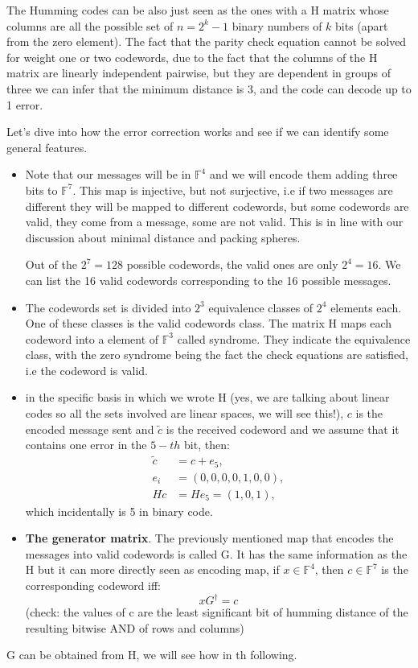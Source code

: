 The Humming codes can be also just seen as the ones with a H matrix whose columns are all the possible set of $n = 2^k-1$ binary numbers of $k$ bits (apart from the zero element). The fact that the parity check equation cannot be solved for weight one or two codewords, due to the fact that the columns of the H matrix are linearly independent pairwise, but they are dependent in groups of three we can infer that the minimum distance is 3, and the code can decode up to 1 error.


Let's dive into how the error correction works and see if we can identify some general features.

\begin{itemize}
	\item Note that our messages will be in $\mathbb{F}^4$ and we will encode them adding three bits to $\mathbb{F}^7$. This map is injective, but not surjective, i.e if two messages are different they will be mapped to different codewords, but some codewords are valid, they come from a message, some are not valid. This is in line with our discussion about minimal distance and packing spheres.

	Out of the $2^7=128$ possible codewords, the valid ones are only $2^4=16$. We can list the 16 valid codewords corresponding to the 16 possible messages.

	\item The codewords set is divided into $2^3$ equivalence classes of $2^4$ elements each. One of these classes is the valid codewords class. The matrix H maps each codeword into a element of $\mathbb{F}^3$ called syndrome. They indicate the equivalence class, with the zero syndrome being the fact the check equations are satisfied, i.e the codeword is valid.
	\item in the specific basis in which we wrote H (yes, we are talking about linear codes so all the sets involved are linear spaces, we will see this!), $c$ is the encoded message sent and $\tilde{c}$ is the received codeword and we assume that it contains one error in the $5-th$ bit, then:
	\begin{equation}
	\begin{split}
	\tilde{c} &= c + e_5, \\
	e_i &= (0, 0, 0, 0, 1, 0, 0), \\
	Hc &= He_5 = (1, 0, 1),
	\end{split}
	\end{equation}
which incidentally is 5 in binary code.
 \item \textbf{The generator matrix}. The previously mentioned map that encodes the messages into valid codewords is called G. It has the same information as the H but it can more directly seen as encoding map, if $x \in \mathbb{F}^4$, then $c \in \mathbb{F}^7$ is the corresponding codeword iff:
 \begin{equation}
	 x G^\dagger=c
 \end{equation}
(check: the values of c are the least significant bit of humming distance of the resulting bitwise AND of rows and columns)
\end{itemize}
G can be obtained from H, we will see how in th following.


